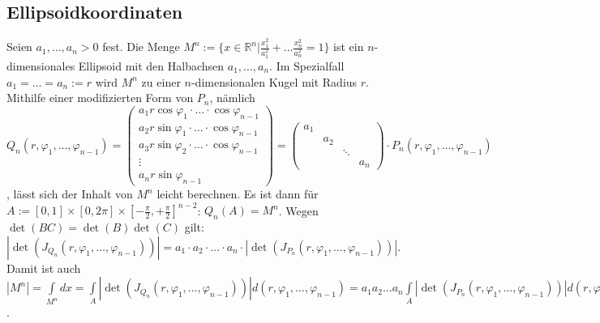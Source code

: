\documentclass[a4paper,11pt]{scrartcl}
\newcommand{\R}{{\ensuremath{\mathbb{R}}}}
\begin{document}
\subsection{\glqq Ellipsoidkoordinaten\grqq}
Seien $a_1,\ldots,a_n>0$ fest. Die Menge $M^n:=\{x\in\R^n|\frac{x_1^2}{a_1^2}+\ldots\frac{x_n^2}{a_n^2}=1\}$ ist ein $n$-dimensionales Ellipsoid mit den Halbachsen $a_1,\ldots,a_n$. Im Spezialfall $a_1=\ldots=a_n:=r$ wird $M^n$ zu einer $n$-dimensionalen Kugel mit Radius $r$.\\
Mithilfe einer modifizierten Form von $P_n$, nämlich\\ $Q_n(r,\varphi_1,\ldots,\varphi_{n-1})=\begin{pmatrix}a_1r\cos\varphi_1\cdot\ldots\cdot\cos\varphi_{n-1} \\ a_2r\sin\varphi_1\cdot\ldots\cdot\cos\varphi_{n-1} \\
a_3r\sin\varphi_2\cdot\ldots\cdot\cos\varphi_{n-1} \\
\vdots \\
a_nr \sin\varphi_{n-1}
\end{pmatrix}=\begin{pmatrix}a_1 & & & \\ & a_2 & & \\ & & \ddots & \\ & & & a_n\end{pmatrix}\cdot P_n(r,\varphi_1,\ldots,\varphi_{n-1})$,
lässt sich der Inhalt von $M^n$ leicht berechnen. Es ist dann für $A:=[0,1]\times[0,2\pi]\times[-\frac{\pi}{2},+\frac{\pi}{2}]^{n-2}$: $Q_n(A)=M^n$. Wegen $\det(BC)=\det(B)\det(C)$ gilt:\\
$|\det(J_{Q_n}(r,\varphi_1,\ldots,\varphi_{n-1}))|=
a_1\cdot a_2\cdot\ldots\cdot a_n\cdot|\det(J_{P_n}(r,\varphi_1,\ldots,\varphi_{n-1}))|$.\\
Damit ist auch $|M^n|=\int\limits_{M^n}dx=\int\limits_A |\det(J_{Q_n}(r,\varphi_1,\ldots,\varphi_{n-1}))|d(r,\varphi_1,\ldots,\varphi_{n-1})=a_1 a_2 \ldots a_n \int\limits_A |\det(J_{P_n}(r,\varphi_1,\ldots,\varphi_{n-1}))|d(r,\varphi_1,\ldots,\varphi_{n-1})=a_1 a_2 \ldots a_n |D(1)^n|$.
\end{document}
